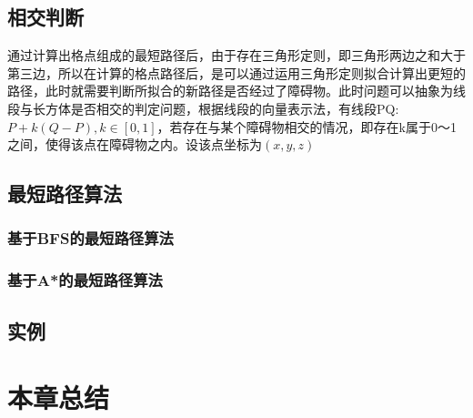 \subsection{相交判断}
\par 通过计算出格点组成的最短路径后，由于存在三角形定则，即三角形两边之和大于第三边，所以在计算的格点路径后，是可以通过运用三角形定则拟合计算出更短的路径，此时就需要判断所拟合的新路径是否经过了障碍物。此时问题可以抽象为线段与长方体是否相交的判定问题，根据线段的向量表示法，有线段PQ:$P+k(Q-P),k\in [0,1]$，若存在与某个障碍物相交的情况，即存在k属于0～1之间，使得该点在障碍物之内。设该点坐标为$(x,y,z)$

\subsection{最短路径算法}
\subsubsection{基于BFS的最短路径算法}
\subsubsection{基于A*的最短路径算法}
\subsection{实例}

\section{本章总结}
